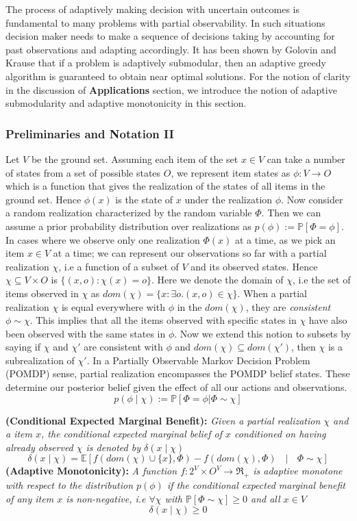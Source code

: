 The process of adaptively making decision with uncertain outcomes is fundamental to many problems with partial observability. In such situations decision maker needs to make a sequence of decisions taking by accounting for past observations and adapting accordingly. It has been shown by Golovin and Krause \cite{Golovin} that if a problem is adaptively submodular, then an adaptive greedy algorithm is guaranteed to obtain near optimal solutions.
For the notion of clarity in the discussion of \textbf{Applications} section, we introduce the notion of adaptive submodularity and adaptive monotonicity in this section.

\subsubsection{Preliminaries and Notation II}
Let $V$ be the ground set. Assuming each item of the set $x\in V$ can take a number of states from a set of possible states $O$, we represent item states as $\phi:V \rightarrow O$ which is a function that gives the realization of the states of all items in the ground set. Hence $\phi(x)$ is the state of $x$ under the realization $\phi$. Now consider a random realization characterized by the random variable $\Phi$. Then we can assume a prior probability distribution over realizations as $p(\phi) := \mathbb{P}[\Phi = \phi]$. 
In cases where we observe only one realization $\Phi(x)$ at a time, as we pick an item $x \in V$ at a time; we can represent our observations so far with a partial realization $\chi$, i.e a function of a subset of $V$ and its observed states. Hence $\chi \subseteq V \times O$ is $\{(x,o):\chi(x) = o\}$. Here we denote the domain of $\chi$, i.e the set of items observed in $\chi$ as $dom(\chi) = \{ x: \exists o.(x,o) \in \chi \}$. When a partial realization $\chi$ is equal everywhere with $\phi$ in the $dom(\chi)$, they are {\it consistent} $\phi \sim \chi$.
This implies that all the items observed with specific states in $\chi$ have also been observed with the same states in $\phi$. Now we extend this notion to subsets by saying if $\chi$ and $\chi'$ are consistent with $\phi$ and $dom(\chi)\subseteq dom(\chi')$, then $\chi$ is a subrealization of $\chi'$. In a Partially Observable Markov Decision Problem (POMDP) sense, partial realization encompasses the POMDP belief states. These determine our posterior belief given the effect of all our actions and observations.
\[
 p(\phi\mid\chi) := \mathbb{P}[\Phi=\phi | \Phi \sim \chi]
\]

{\bf {} (Conditional Expected Marginal Benefit):} 
{\it Given a partial realization $\chi$ and a item $x$, the conditional expected marginal belief of $x$ conditioned on having already observed $\chi$ is denoted by $\delta(x\mid\chi)$
\[
 \delta(x\mid\chi) = \mathbb{E}[f(dom(\chi)\cup\{x\},\Phi) - f(dom(\chi),\Phi) \text{ } \mid \text{ } \Phi \sim \chi]
\]
}
{\bf {} (Adaptive Monotonicity):}
{\it A function $f:2^V \times O^V \rightarrow \Re_+$ is adaptive monotone with respect to the distribution $p(\phi)$ if the conditional expected marginal benefit of any item $x$ is non-negative, i.e $\forall \chi$ with $\mathbb{P}[\Phi \sim \chi] \geq 0$ and all $x\in V$ }
\[
 \delta(x\mid\chi) \geq 0
\]

